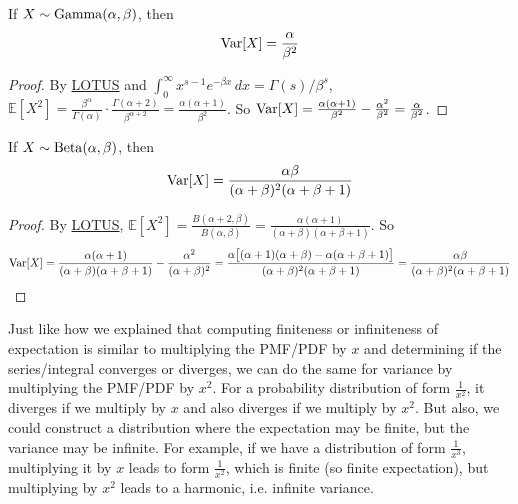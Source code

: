   \begin{theorem}
    \label{thm:variance-of-gamma}
    If \hyperref[def:gamma-random-variable]{$X \sim \operatorname{Gamma}(\alpha, \beta)$}, then 
    \begin{equation}
      \operatorname{Var}[X] = \frac{\alpha}{\beta^2}
    \end{equation}
  \end{theorem}
  \begin{proof}
    By \hyperref[thm:lotus]{LOTUS} and $\int_0^\infty x^{s-1} e^{-\beta x} \,dx = \Gamma(s) / \beta^s$, $\mathbb{E}[X^2] = \frac{\beta^\alpha}{\Gamma(\alpha)} \cdot \frac{\Gamma(\alpha + 2)}{\beta^{\alpha + 2}} = \frac{\alpha (\alpha + 1)}{\beta^2}$. So $\operatorname{Var}[X] = \frac{\alpha(\alpha+1)}{\beta^2} - \frac{\alpha^2}{\beta^2} = \frac{\alpha}{\beta^2}$. 
  \end{proof}

  \begin{theorem}
    \label{thm:variance-of-beta}
    If \hyperref[def:beta-random-variable]{$X \sim \operatorname{Beta}(\alpha, \beta)$}, then 
    \begin{equation}
      \operatorname{Var}[X] = \frac{\alpha \beta}{(\alpha + \beta)^2 (\alpha + \beta + 1)}
    \end{equation}
  \end{theorem}
  \begin{proof}
    By \hyperref[thm:lotus]{LOTUS}, $\mathbb{E}[X^2] = \frac{B(\alpha + 2, \beta)}{B(\alpha, \beta)} = \frac{\alpha (\alpha + 1)}{(\alpha + \beta)(\alpha + \beta + 1)}$. So 
    \begin{equation}
      \operatorname{Var}[X] = \frac{\alpha (\alpha + 1)}{(\alpha + \beta)(\alpha + \beta + 1)} - \frac{\alpha^2}{(\alpha + \beta)^2} = \frac{\alpha \big[ (\alpha + 1)(\alpha + \beta) - \alpha (\alpha + \beta + 1) \big]}{(\alpha + \beta)^2 (\alpha + \beta + 1)} = \frac{\alpha \beta}{(\alpha + \beta)^2 (\alpha + \beta + 1)}
    \end{equation}
  \end{proof}

  Just like how we explained that computing finiteness or infiniteness of expectation is similar to multiplying the PMF/PDF by $x$ and determining if the series/integral converges or diverges, we can do the same for variance by multiplying the PMF/PDF by $x^2$. For a probability distribution of form $\frac{1}{x^2}$, it diverges if we multiply by $x$ and also diverges if we multiply by $x^2$. But also, we could construct a distribution where the expectation may be finite, but the variance may be infinite. For example, if we have a distribution of form $\frac{1}{x^3}$, multiplying it by $x$ leads to form $\frac{1}{x^2}$, which is finite (so finite expectation), but multiplying by $x^2$ leads to a harmonic, i.e. infinite variance. 

